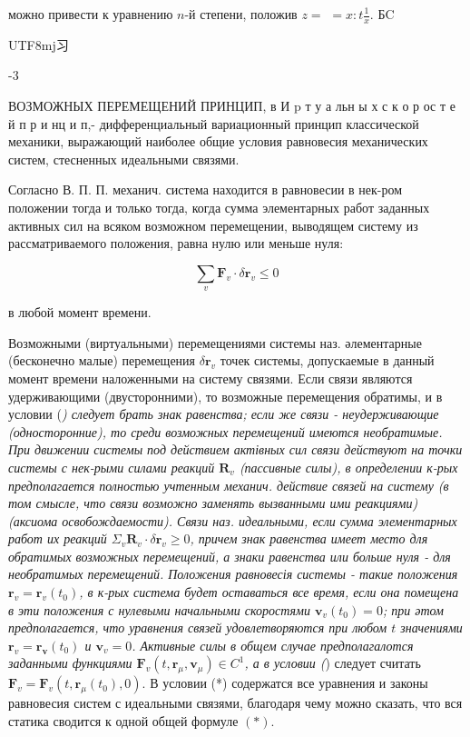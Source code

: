 \documentclass[10pt]{article}
\begin{document}
можно привести к уравнению $n$-й степени, положив $z=$ $=x: t \frac{1}{x}$. БC\begin{CJK}{UTF8}{mj}习\end{CJK}-3



ВОЗМОЖНЫХ ПЕРЕМЕЩЕНИЙ ПРИНЦИП, в И $\mathrm{p}$ т у а льн ы х с к о р ос т е й п р и нц и п,- дифференциальный вариационный принцип классической механики, выражающий наиболее общие условия равновесия механических систем, стесненных идеальными связями.



Согласно В. П. П. механич. система находится в равновесии в нек-ром положении тогда и только тогда, когда сумма элементарных работ заданных активных сил на всяком возможном перемещении, выводящем систему из рассматриваемого положения, равна нулю или меньше нуля:



\[

\sum_{v} \boldsymbol{F}_{v} \cdot \delta \boldsymbol{r}_{v} \leqslant 0

\]



в любой момент времени.



Возможными (виртуальными) перемещениями системы наз. әлементарные (бесконечно малые) перемещения $\delta \boldsymbol{r}_{v}$ точек системы, допускаемые в данный момент времени наложенными на систему связями. Если связи являются удерживающими (двусторонними), то возможные перемещения обратимы, и в условии (\textit{) следует брать знак равенства; если же связи - неудерживающие (односторонние), то среди возможных перемещений имеются необратимые. При движении системы под действием актівных сил связи действуют на точки системы с нек-рыми силами реакций $\boldsymbol{R}_{v}$ (пассивные силы), в определении к-рых предполагается полностью учтенным механич. действие связей на систему (в том смысле, что связи возможно заменять вызванными ими реакциями) (аксиома освобождаемости). Связи наз. идеальными, если сумма элементарных работ их реакций $\Sigma_{v} \boldsymbol{R}_{v} \cdot \delta \boldsymbol{r}_{v} \geqslant 0$, причем знак равенства имеет место для обратимых возможных перемещений, а знаки равенства или больше нуля - для необратимых перемещений. Положения равновесія системы - такие положения $\boldsymbol{r}_{v}=\boldsymbol{r}_{v}\left(t_{0}\right)$, в к-рых система будет оставаться все время, если она помещена в эти положения с нулевыми начальными скоростями $\boldsymbol{v}_{v}\left(t_{0}\right)=0$; при әтом предполагается, что уравнения связей удовлетворяются при любом $t$ значениями $\boldsymbol{r}_{v}=\boldsymbol{r}_{\boldsymbol{v}}\left(t_{0}\right)$ и $\boldsymbol{v}_{v}=0$. Активные силы в общем случае предполагалотся заданными функциями $\boldsymbol{F}_{v}\left(t, \boldsymbol{r}_{\mu}, \boldsymbol{v}_{\mu}\right) \in C^{1}$, а в условии (}) следует считать $\boldsymbol{F}_{v}=\boldsymbol{F}_{v}\left(t, \boldsymbol{r}_{\mu}\left(t_{0}\right), 0\right)$. В условии (*) содержатся все уравнения и законы равновесия систем с идеальными связями, благодаря чему можно сказать, что вся статика сводится к одной общей формуле $(*)$.
\end{document}
